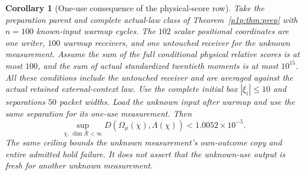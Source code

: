 \documentclass[11pt]{article}
\numberwithin{equation}{section}
\newtheorem{corollary}[theorem]{Corollary}
\theoremstyle{definition}
\theoremstyle{remark}
\begin{document}
\begin{corollary}[One-use consequence of the physical-score row]
\label{p1i:cor:PM100}
Take the preparation parent and complete actual-law class of
Theorem~\ref{p1p:thm:prep} with $n=100$ known-input warmup cycles.
The $102$ scalar positional coordinates are one writer, $100$ warmup
receivers, and one untouched receiver for the unknown measurement.
Assume the sum of the full conditional physical relative scores is at
most $100$, and the sum of actual standardized twentieth moments is at
most $10^{15}$. All these conditions include the untouched receiver and
are averaged against the actual retained external-context law. Use the
complete initial box $|\xi_i|\leq10$ and separations $50$ packet widths.
Load the unknown input after warmup and use the same separation for its
one-use measurement. Then
\begin{equation}\label{p1i:eq:headline}
 \sup_{\chi,\,\dim\mathcal R<\infty}
 D(\Omega_\mu(\chi),\Lambda(\chi))<1.0052\times10^{-5}.
\end{equation}
The same ceiling bounds the unknown measurement's own-outcome copy and
entire admitted hold failure. It does not assert that the unknown-use
output is fresh for another unknown measurement.
\end{corollary}
\end{document}
